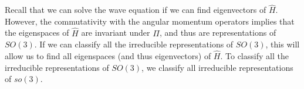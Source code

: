 Recall that we can solve the wave equation if we can find eigenvectors of $\hat{H}$. However, the commutativity with the angular momentum operators implies that the eigenspaces of $\hat{H}$ are invariant under $\Pi$, and thus are representations of $SO(3)$. If we can classify all the irreducible representations of $SO(3)$, this will allow us to find all eigenspaces (and thus eigenvectors) of $\hat{H}$. To classify all the irreducible representations of $SO(3)$, we classify all irreducible representations of $so(3)$.
